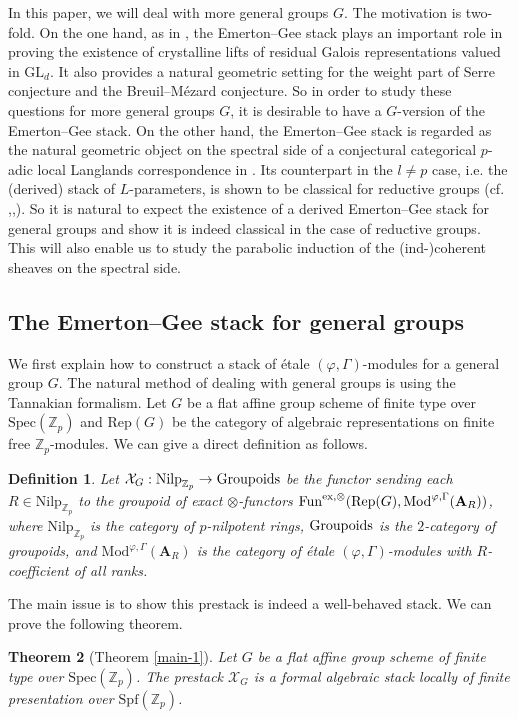 \documentclass[10pt]{article}
\newtheorem{thm}{Theorem}[section]
\newtheorem{dfn}[thm]{Definition}
\numberwithin{equation}{section}
\newcommand{\bZ}{{\mathbb Z}}
\newcommand{\calX}{{\mathcal X}}
\newcommand{\Mod}{{\mathrm{Mod}}}           %
\newcommand{\Rep}{{\mathrm{Rep}}}           %
\newcommand{\Spf}{{\mathrm{Spf}}}           %
\newcommand{\Spec}{{\mathrm{Spec}}}         %
\newcommand{\GL}{{\mathrm{GL}}}             %
\newcommand{\Nilp}{\mathrm{Nilp}}
\newcommand{\bfA}{{\textbf{A}}}
\newcommand{\Fun}{\mathrm{Fun}}
\begin{document}
In this paper, we will deal with more general groups $G$. The motivation is two-fold. On the one hand, as in \cite{EG22}, the Emerton--Gee stack plays an important role in proving the existence of crystalline lifts of residual Galois representations valued in $\GL_d$. It also provides a natural geometric setting for the weight part of Serre conjecture and the Breuil--M\'ezard conjecture. So in order to study these questions for more general groups $G$, it is desirable to have a $G$-version of the Emerton--Gee stack. On the other hand, the Emerton--Gee stack is regarded as the natural geometric object on the spectral side of a conjectural categorical $p$-adic local Langlands correspondence in \cite{EGH22}. Its counterpart in the $l\neq p$ case, i.e. the (derived) stack of $L$-parameters, is shown to be classical for reductive groups (cf. \cite{FS21},\cite{DHKM20},\cite{Zhu20}). So it is natural to expect the existence of a derived Emerton--Gee stack for general groups and show it is indeed classical in the case of reductive groups. This will also enable us to study the parabolic induction of the (ind-)coherent sheaves on the spectral side.




\subsection{The Emerton--Gee stack for general groups}
We first explain how to construct a stack of \'etale $(\varphi,\Gamma)$-modules for a general group $G$. The natural method of dealing with general groups is using the Tannakian formalism. Let $G$ be a flat affine group scheme of finite type over $\Spec(\bZ_p)$ and $\Rep(G)$ be the category of algebraic representations on finite free $\bZ_p$-modules. We can give a direct definition as follows.


\begin{dfn}
    Let $\calX_G:\Nilp_{\bZ_p}\to {\rm Groupoids}$ be the functor sending each $R\in \Nilp_{\bZ_p}$ to the groupoid of exact $\otimes$-functors $\Fun^{\rm ex,\otimes}(\Rep(G),\Mod^{\varphi,\Gamma}(\bfA_R))$, where $\Nilp_{\bZ_p}$ is the category of $p$-nilpotent rings, ${\rm Groupoids}$ is the $2$-category of groupoids, and $\Mod^{\varphi,\Gamma}(\bfA_R)$ is the category of \'etale $(\varphi,\Gamma)$-modules with $R$-coefficient of all ranks. 
\end{dfn}

The main issue is to show this prestack is indeed a well-behaved stack. We can prove the following theorem.
\begin{thm}[Theorem \ref{main-1}]\label{main-1-intro}
    Let $G$ be a flat affine group scheme of finite type over $\Spec(\bZ_p)$. The prestack $\calX_G$ is a formal algebraic stack locally of finite presentation over $\Spf(\bZ_p)$.
\end{thm}
\end{document}
